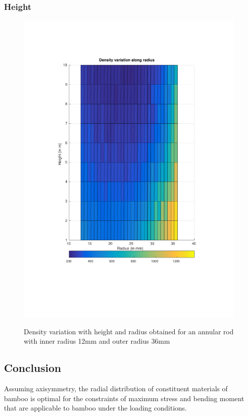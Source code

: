 \documentclass[10pt]{article}
\begin{document}
\subsubsection{Height}
\begin{figure}[H]
\begin{center}
	\includegraphics[clip, trim=2cm 5cm 2cm 3cm, scale=0.4]{./Plots/height/height.pdf}
	\label{fig:height}
	\caption{Density variation with height and radius obtained for an annular rod with inner radius 12mm and outer radius 36mm}
\end{center}
\end{figure}

\subsection{Conclusion}
Assuming axisymmetry, the radial distribution of constituent materials of bamboo is optimal for the constraints of maximum stress and bending moment that are applicable to bamboo under the loading conditions.
\end{document}
